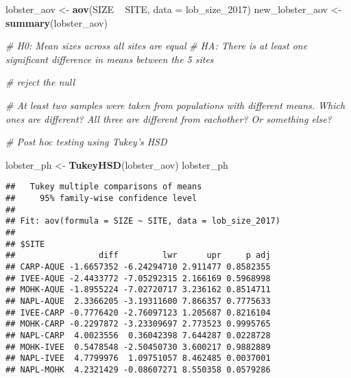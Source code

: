 \documentclass[]{article}
\newenvironment{Shaded}{\begin{snugshade}}{\end{snugshade}}
\newcommand{\KeywordTok}[1]{\textcolor[rgb]{0.13,0.29,0.53}{\textbf{{#1}}}}
\newcommand{\DataTypeTok}[1]{\textcolor[rgb]{0.13,0.29,0.53}{{#1}}}
\newcommand{\StringTok}[1]{\textcolor[rgb]{0.31,0.60,0.02}{{#1}}}
\newcommand{\CommentTok}[1]{\textcolor[rgb]{0.56,0.35,0.01}{\textit{{#1}}}}
\newcommand{\NormalTok}[1]{{#1}}
\begin{document}
\begin{Shaded}
\begin{Highlighting}[]
\NormalTok{lobster_aov <-}\StringTok{ }\KeywordTok{aov}\NormalTok{(SIZE ~}\StringTok{ }\NormalTok{SITE, }\DataTypeTok{data =} \NormalTok{lob_size_2017)}
\NormalTok{new_lobster_aov <-}\StringTok{ }\KeywordTok{summary}\NormalTok{(lobster_aov)}


\CommentTok{# H0: Mean sizes across all sites are equal}
\CommentTok{# HA: There is at least one significant difference in means between the 5 sites}

\CommentTok{# reject the null}

\CommentTok{# At least two samples were taken from populations with different means. Which ones are different? All three are different from eachother? Or something else?}


\CommentTok{# Post hoc testing using Tukey's HSD}

\NormalTok{lobster_ph <-}\StringTok{ }\KeywordTok{TukeyHSD}\NormalTok{(lobster_aov)}
\NormalTok{lobster_ph}
\end{Highlighting}
\end{Shaded}

\begin{verbatim}
##   Tukey multiple comparisons of means
##     95% family-wise confidence level
## 
## Fit: aov(formula = SIZE ~ SITE, data = lob_size_2017)
## 
## $SITE
##                 diff         lwr      upr     p adj
## CARP-AQUE -1.6657352 -6.24294710 2.911477 0.8582355
## IVEE-AQUE -2.4433772 -7.05292315 2.166169 0.5968998
## MOHK-AQUE -1.8955224 -7.02720717 3.236162 0.8514711
## NAPL-AQUE  2.3366205 -3.19311600 7.866357 0.7775633
## IVEE-CARP -0.7776420 -2.76097123 1.205687 0.8216104
## MOHK-CARP -0.2297872 -3.23309697 2.773523 0.9995765
## NAPL-CARP  4.0023556  0.36042398 7.644287 0.0228728
## MOHK-IVEE  0.5478548 -2.50450730 3.600217 0.9882889
## NAPL-IVEE  4.7799976  1.09751057 8.462485 0.0037001
## NAPL-MOHK  4.2321429 -0.08607271 8.550358 0.0579286
\end{verbatim}

\begin{Shaded}
\end{Shaded}
\end{document}
